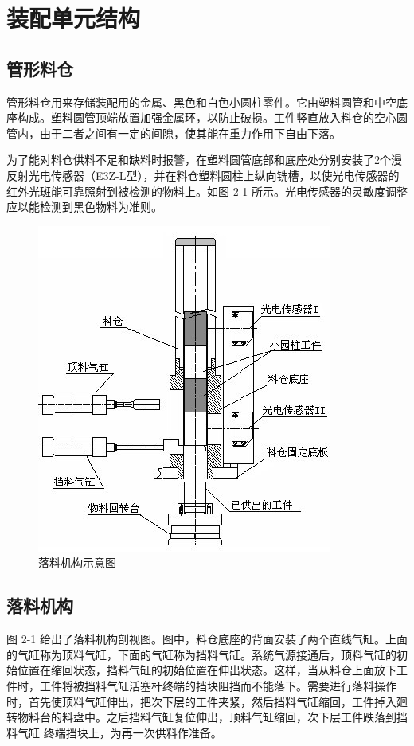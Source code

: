\documentclass[12pt]{article}
\begin{document}
\section{装配单元结构}
\subsection{管形料仓}
管形料仓用来存储装配用的金属、黑色和白色小圆柱零件。它由塑料圆管和中空底座构成。塑料圆管顶端放置加强金属环，以防止破损。工件竖直放入料仓的空心圆管内，由于二者之间有一定的间隙，使其能在重力作用下自由下落。 

为了能对料仓供料不足和缺料时报警，在塑料圆管底部和底座处分别安装了2个漫反射光电传感器（E3Z-L型），并在料仓塑料圆柱上纵向铣槽，以使光电传感器的红外光斑能可靠照射到被检测的物料上。如图 2-1 所示。光电传感器的灵敏度调整应以能检测到黑色物料为准则。
\begin{figure}[htbp]
    \centering
    \includegraphics[scale=0.8]{fig/2-1.jpg}
    \caption{落料机构示意图}
\end{figure} 

\subsection{落料机构}
图 2-1 给出了落料机构剖视图。图中，料仓底座的背面安装了两个直线气缸。上面的气缸称为顶料气缸，下面的气缸称为挡料气缸。系统气源接通后，顶料气缸的初始位置在缩回状态，挡料气缸的初始位置在伸出状态。这样，当从料仓上面放下工件时，工件将被挡料气缸活塞杆终端的挡块阻挡而不能落下。需要进行落料操作时，首先使顶料气缸伸出，把次下层的工件夹紧，然后挡料气缸缩回，工件掉入廻转物料台的料盘中。之后挡料气缸复位伸出，顶料气缸缩回，次下层工件跌落到挡料气缸
终端挡块上，为再一次供料作准备。
\end{document}
